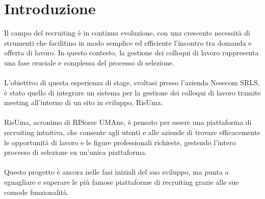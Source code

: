 \chapter*{Introduzione}  
 
Il campo del recruiting è in continua evoluzione, con una crescente necessità di strumenti 
che facilitino in modo semplice ed efficiente l'incontro tra domanda e offerta di lavoro. 
In questo contesto, la gestione dei colloqui di lavoro rappresenta una fase cruciale e
complessa del processo di selezione. 
\\
\\
L'obiettivo di questa esperienza di stage, svoltasi presso l'azienda Nesecom SRLS, 
è stato quello di integrare un sistema per la gestione dei colloqui di lavoro tramite meeting
all'interno di un sito in sviluppo, RisUma.
\\ 
\\
RisUma, acronimo di RISorse UMAne, è pensato per essere una piattaforma di recruiting intuitiva, 
che consente agli utenti e alle aziende di trovare efficacemente le opportunità di lavoro e 
le figure professionali richieste, gestendo l'intero processo di selezione su un'unica piattaforma.
\\
\\
Questo progetto è ancora nelle fasi iniziali del suo sviluppo, ma punta a eguagliare 
e superare le più famose piattaforme di recruiting grazie alle sue comode funzionalità.